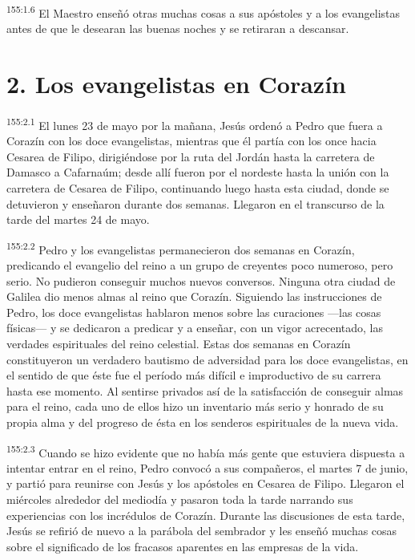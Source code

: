 \par 
\textsuperscript{155:1.6} El Maestro enseñó otras muchas cosas a sus apóstoles y a los evangelistas antes de que le desearan las buenas noches y se retiraran a descansar.

\section*{2. Los evangelistas en Corazín}
\par 
\textsuperscript{155:2.1} El lunes 23 de mayo por la mañana, Jesús ordenó a Pedro que fuera a Corazín con los doce evangelistas, mientras que él partía con los once hacia Cesarea de Filipo, dirigiéndose por la ruta del Jordán hasta la carretera de Damasco a Cafarnaúm; desde allí fueron por el nordeste hasta la unión con la carretera de Cesarea de Filipo, continuando luego hasta esta ciudad, donde se detuvieron y enseñaron durante dos semanas. Llegaron en el transcurso de la tarde del martes 24 de mayo.

\par 
\textsuperscript{155:2.2} Pedro y los evangelistas permanecieron dos semanas en Corazín, predicando el evangelio del reino a un grupo de creyentes poco numeroso, pero serio. No pudieron conseguir muchos nuevos conversos. Ninguna otra ciudad de Galilea dio menos almas al reino que Corazín. Siguiendo las instrucciones de Pedro, los doce evangelistas hablaron menos sobre las curaciones ---las cosas físicas--- y se dedicaron a predicar y a enseñar, con un vigor acrecentado, las verdades espirituales del reino celestial. Estas dos semanas en Corazín constituyeron un verdadero bautismo de adversidad para los doce evangelistas, en el sentido de que éste fue el período más difícil e improductivo de su carrera hasta ese momento. Al sentirse privados así de la satisfacción de conseguir almas para el reino, cada uno de ellos hizo un inventario más serio y honrado de su propia alma y del progreso de ésta en los senderos espirituales de la nueva vida.

\par 
\textsuperscript{155:2.3} Cuando se hizo evidente que no había más gente que estuviera dispuesta a intentar entrar en el reino, Pedro convocó a sus compañeros, el martes 7 de junio, y partió para reunirse con Jesús y los apóstoles en Cesarea de Filipo. Llegaron el miércoles alrededor del mediodía y pasaron toda la tarde narrando sus experiencias con los incrédulos de Corazín. Durante las discusiones de esta tarde, Jesús se refirió de nuevo a la parábola del sembrador y les enseñó muchas cosas sobre el significado de los fracasos aparentes en las empresas de la vida.

